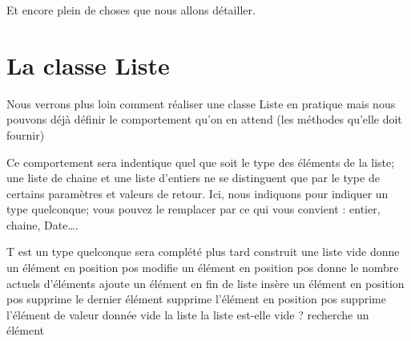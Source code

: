 	Et encore plein de choses que nous allons détailler.
	
	\section{La classe Liste}
	
		Nous verrons plus loin comment réaliser une classe Liste en pratique 
		mais nous pouvons déjà définir le comportement qu’on en attend 
		(les méthodes qu’elle doit fournir)
		
		Ce comportement sera indentique quel que soit le type des éléments
		de la liste; une liste de chaine et une liste d'entiers
		ne se distinguent que par le type de certains paramètres
		et valeurs de retour.
		Ici, nous indiquons  pour indiquer un type quelconque;
		vous pouvez le remplacer par ce qui vous convient : entier, chaine, Date\dots.
		
		\begin{LDA}
				\RComment T est un type quelconque
				\Private
					\LComment sera complété plus tard	
				\Public
						\RComment construit une liste vide
						\RComment donne un élément en position pos
						\RComment modifie un élément en position pos
						\RComment donne le nombre actuels d’éléments
						\RComment ajoute un élément en fin de liste
						\RComment insère un élément en position pos
						\RComment supprime le dernier élément
						\RComment supprime l'élément en position pos
						\RComment supprime l'élément de valeur donnée
						\RComment vide la liste
						\RComment la liste est-elle vide ?
						\RComment recherche un élément
				\EndClass
		\end{LDA}
		
		\bigskip
		
